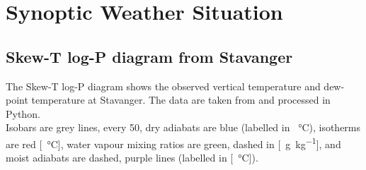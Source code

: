 \chapter{Synoptic Weather Situation}
\section{Skew-T log-P diagram from Stavanger}%
\label{app:sounding}
The Skew-T log-P diagram shows the observed vertical temperature and dew-point temperature at Stavanger. The data are taken from \cite{university_wyoming_atmospheric_2018} and processed in Python.
\\
\noindent
Isobars are grey lines, every \SI{50}{\hPa}, dry adiabats are blue (labelled in \SI{}{\celsius}), isotherms are red [\SI{}{\celsius}], water vapour mixing ratios are green, dashed in [\SI{}{\gram\per\kilogram}], and moist adiabats are dashed, purple lines (labelled in [\SI{}{\celsius}]).

